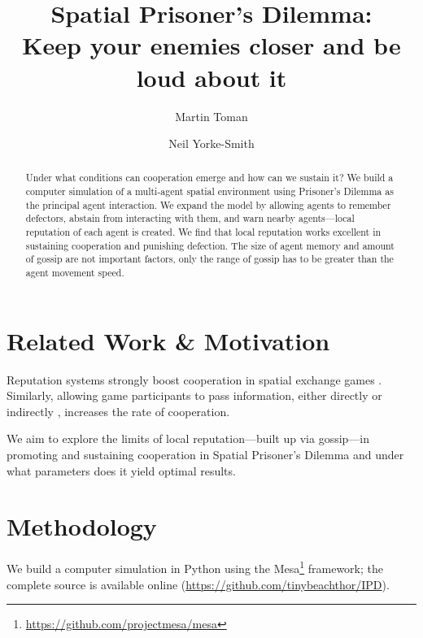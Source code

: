 \documentclass[runningheads]{llncs}
\begin{document}
%
\title{
Spatial Prisoner’s Dilemma: \\
Keep your enemies closer and be loud about it}
%
%
\author{
Martin Toman \and
Neil Yorke-Smith
}
%
%
%
\maketitle              %
%
%
%
\begin{abstract}
Under what conditions can cooperation emerge and how can we sustain it?
We build a computer simulation of a multi-agent spatial environment using Prisoner's Dilemma as the principal agent interaction.
We expand the model by allowing agents to remember defectors, abstain from interacting with them, and warn nearby agents---local reputation of each agent is created.
We find that local reputation works excellent in sustaining cooperation and punishing defection.
The size of agent memory and amount of gossip are not important factors,
only the range of gossip has to be greater than the agent movement speed.

\end{abstract}
%
%
%
\section{Related Work \& Motivation}
Reputation systems strongly boost cooperation in spatial exchange games \cite{simple-reputation, dong-reputation}.
Similarly, allowing game participants to pass information, either directly \cite{cooperation-communication} or indirectly \cite{public-private-monitoring}, increases the rate of cooperation.

We aim to explore the limits of local reputation---built up via gossip---in promoting and sustaining cooperation in Spatial Prisoner’s Dilemma and under what parameters does it yield optimal results.
%
%
%
\section{Methodology}
We build a computer simulation \cite{smaldino} in Python using the Mesa\footnote{\url{https://github.com/projectmesa/mesa}} framework; the complete source is available online (\url{https://github.com/tinybeachthor/IPD}).
\end{document}
